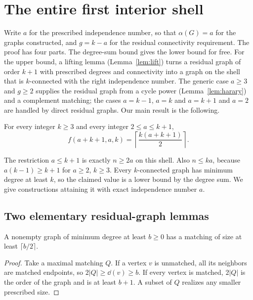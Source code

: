 \section{The entire first interior shell}\label{sec:shell}

Write $a$ for the prescribed independence number, so that $\alpha(G)=a$ for the graphs constructed, and $g=k-a$ for the residual connectivity requirement.
The proof has four parts.
The degree-sum bound gives the lower bound for free.
For the upper bound, a lifting lemma (Lemma~\ref{lem:lift}) turns a residual graph of order $k+1$ with prescribed degrees and connectivity into a graph on the shell that is $k$-connected with the right independence number.
The generic case $a\ge3$ and $g\ge2$ supplies the residual graph from a cycle power (Lemma~\ref{lem:harary}) and a complement matching; the cases $a=k-1$, $a=k$ and $a=k+1$ and $a=2$ are handled by direct residual graphs.
Our main result is the following.

\begin{theorem}\label{thm:shell}
For every integer $k\ge3$ and every integer $2\le a\le k+1$,
\begin{equation}
f(a+k+1,a,k)=\left\lceil\frac{k(a+k+1)}2\right\rceil.
\end{equation}
\end{theorem}

The restriction $a\le k+1$ is exactly $n\ge2a$ on this shell.
Also $n\le ka$, because $a(k-1)\ge k+1$ for $a\ge2$, $k\ge3$.
Every $k$-connected graph has minimum degree at least $k$, so the claimed value is a lower bound by the degree sum.
We give constructions attaining it with exact independence number $a$.

\subsection{Two elementary residual-graph lemmas}

\begin{lemma}\label{lem:matching}
A nonempty graph of minimum degree at least $b\ge0$ has a matching of size at least $\lceil b/2\rceil$.
\end{lemma}
\begin{proof}
Take a maximal matching $Q$. If a vertex $v$ is unmatched, all its neighbors are matched endpoints, so $2|Q|\ge\dd(v)\ge b$.
If every vertex is matched, $2|Q|$ is the order of the graph and is at least $b+1$.
A subset of $Q$ realizes any smaller prescribed size.
\end{proof}

